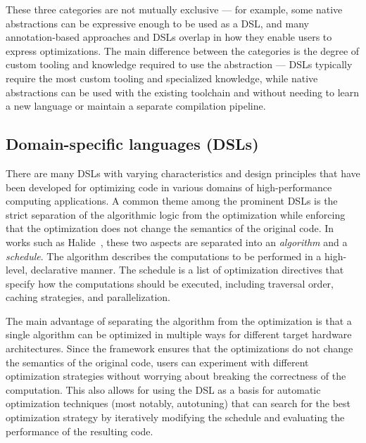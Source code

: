 These three categories are not mutually exclusive --- for example, some native abstractions can be expressive enough to be used as a DSL, and many annotation-based approaches and DSLs overlap in how they enable users to express optimizations. The main difference between the categories is the degree of custom tooling and knowledge required to use the abstraction --- DSLs typically require the most custom tooling and specialized knowledge, while native abstractions can be used with the existing toolchain and without needing to learn a new language or maintain a separate compilation pipeline.


\subsection{Domain-specific languages (DSLs)}\label{sec:dsl}


There are many DSLs with varying characteristics and design principles that have been developed for optimizing code in various domains of high-performance computing applications. A common theme among the prominent DSLs is the strict separation of the algorithmic logic from the optimization while enforcing that the optimization does not change the semantics of the original code. In works such as Halide~\cite{ragan2013halide}, these two aspects are separated into an \textit{algorithm} and a \textit{schedule}. The algorithm describes the computations to be performed in a high-level, declarative manner. The schedule is a list of optimization directives that specify how the computations should be executed, including traversal order, caching strategies, and parallelization.

The main advantage of separating the algorithm from the optimization is that a single algorithm can be optimized in multiple ways for different target hardware architectures. Since the framework  ensures that the optimizations do not change the semantics of the original code, users can experiment with different optimization strategies without worrying about breaking the correctness of the computation. This also allows for using the DSL as a basis for automatic optimization techniques (most notably, autotuning) that can search for the best optimization strategy by iteratively modifying the schedule and evaluating the performance of the resulting code.

